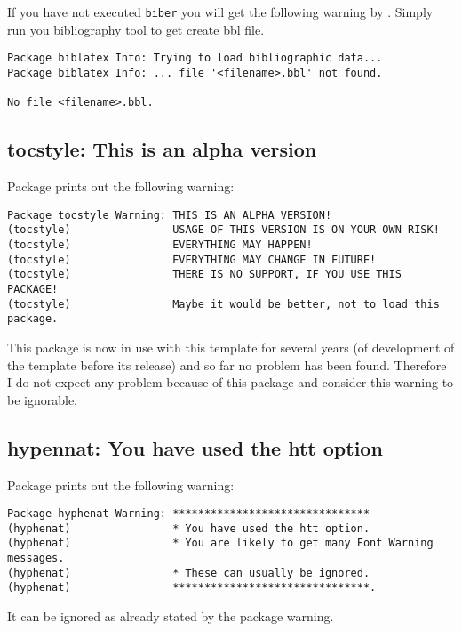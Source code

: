 If you have not executed \texttt{biber} you will get the following warning by
. Simply run you bibliography tool to get create bbl file.

\begin{verbatim}
Package biblatex Info: Trying to load bibliographic data...
Package biblatex Info: ... file '<filename>.bbl' not found.

No file <filename>.bbl.
\end{verbatim}

%


\subsection{tocstyle: This is an alpha version}

Package  prints out the following warning:
%
\begin{verbatim}
Package tocstyle Warning: THIS IS AN ALPHA VERSION!
(tocstyle)                USAGE OF THIS VERSION IS ON YOUR OWN RISK!
(tocstyle)                EVERYTHING MAY HAPPEN!
(tocstyle)                EVERYTHING MAY CHANGE IN FUTURE!
(tocstyle)                THERE IS NO SUPPORT, IF YOU USE THIS PACKAGE!
(tocstyle)                Maybe it would be better, not to load this package.
\end{verbatim}
%
This package is now in use with this template for several years (of development of the template before its release) and so far no problem has been found. Therefore I do not expect any problem because of this package and consider this warning to be ignorable.

\subsection{hypennat: You have used the htt option}

Package  prints out the following warning:
%
\begin{verbatim}
Package hyphenat Warning: *******************************
(hyphenat)                * You have used the htt option.
(hyphenat)                * You are likely to get many Font Warning messages.
(hyphenat)                * These can usually be ignored.
(hyphenat)                *******************************.
\end{verbatim}
%
It can be ignored as already stated by the package warning.


